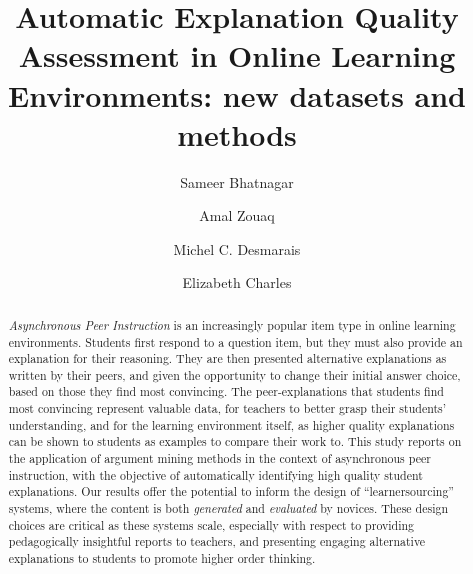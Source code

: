 \documentclass[runningheads]{llncs}
\begin{document}
%
\title{Automatic Explanation Quality Assessment in Online Learning 
Environments: new datasets and methods}
%
\author{Sameer Bhatnagar \and
Amal Zouaq \and
Michel C. Desmarais \and
Elizabeth Charles
}
%

%
\maketitle              %
%
\begin{abstract}
\textit{Asynchronous Peer Instruction} is an increasingly popular item type in 
online learning environments. Students first respond to a question item, but 
they must also provide an explanation for their reasoning. 
They are then presented alternative explanations as written by their peers, and 
given the opportunity to change their initial answer choice, based on those 
they find most convincing. 
The peer-explanations that students find most convincing represent valuable 
data, for teachers to better grasp their students' understanding, and for the 
learning environment itself, as higher quality explanations can be shown to 
students as examples to compare their work to. 
This study reports on the application of argument mining methods in the 
context of asynchronous peer instruction, with the objective of automatically 
identifying high quality student explanations. 
Our results offer the potential to inform the design of ``learnersourcing'' 
systems, where the content is both \textit{generated} and \textit{evaluated} by 
novices. 
These design choices are critical as these systems scale, especially with 
respect to providing pedagogically insightful reports to teachers, and 
presenting engaging alternative explanations to students to promote higher 
order thinking. 

\end{abstract}

\end{document}
